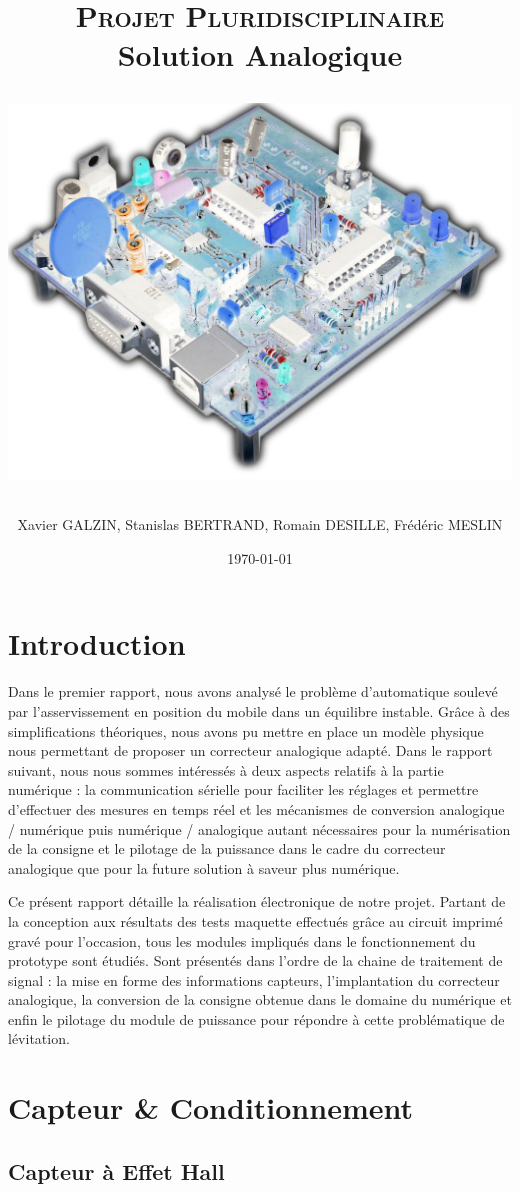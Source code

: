 \documentclass[11pt, french]{article} %
\title{\textsc{Projet Pluridisciplinaire} \\ Solution Analogique \\
\begin{minipage}[c][20cm][c]{15cm}
\includegraphics[width=15cm]{../Photos/CarteFrontInv.png}
\end{minipage}}
\author{Xavier GALZIN, Stanislas BERTRAND, Romain DESILLE, Frédéric MESLIN}
\date{\today}
\begin{document}
\maketitle

\pagebreak
\tableofcontents

\pagebreak
\section*{Introduction}

Dans le premier rapport, nous avons analysé le problème d'automatique soulevé par l'asservissement en position du mobile dans un équilibre instable. Grâce à des simplifications théoriques, nous avons pu mettre en place un modèle physique nous permettant de proposer un correcteur analogique adapté. 
Dans le rapport suivant, nous nous sommes intéressés à deux aspects relatifs à la partie numérique : la communication sérielle pour faciliter les réglages et permettre d'effectuer des mesures en temps réel et les mécanismes de conversion analogique / numérique puis numérique / analogique autant nécessaires pour la numérisation de la consigne et le pilotage de la puissance dans le cadre du correcteur analogique que pour la future solution à saveur plus numérique. 
\medskip

Ce présent rapport détaille la réalisation électronique de notre projet. Partant de la conception aux résultats des tests maquette effectués grâce au circuit imprimé gravé pour l'occasion, tous les modules impliqués dans le fonctionnement du prototype sont étudiés. Sont présentés dans l'ordre de la chaine de traitement de signal : la mise en forme des informations capteurs, l'implantation du correcteur analogique, la conversion de la consigne obtenue dans le domaine du numérique et enfin le pilotage du module de puissance pour répondre à cette problématique de lévitation.


\section{Capteur \& Conditionnement}
\subsection{Capteur à Effet Hall}
\end{document}
